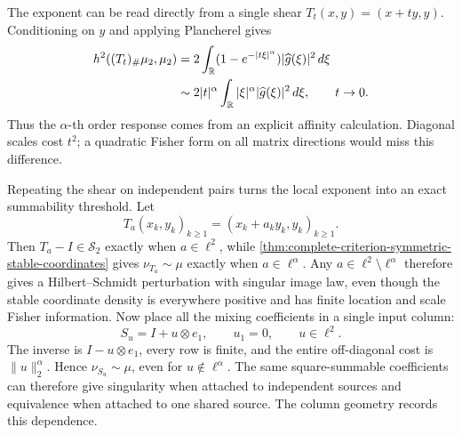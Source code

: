 The exponent can be read directly from a single shear
\(T_t(x,y)=(x+ty,y)\).  Conditioning on \(y\) and applying Plancherel gives
\begin{equation}
 \begin{aligned}
 h^2((T_t)_\#\mu_{2},\mu_{2})
 &=2\int_\mathbb R(1-e^{-|t\xi|^\alpha})
                  |\widehat g(\xi)|^2\,d\xi\\
 &\sim2|t|^\alpha\int_\mathbb R|\xi|^\alpha
                  |\widehat g(\xi)|^2\,d\xi,\qquad t\to0.
 \end{aligned}
\end{equation}
Thus the \(\alpha\)-th order response comes from an explicit affinity
calculation. Diagonal scales cost \(t^2\); a quadratic Fisher form on all
matrix directions would miss this difference.

Repeating the shear on independent pairs turns the local exponent into
an exact summability threshold. Let
\[
 T_a(x_k,y_k)_{k\ge1}=(x_k+a_ky_k,y_k)_{k\ge1}.
\]
Then \(T_a-I\in\mathcal S_2\) exactly when \(a\in\ell^2\), while
\cref{thm:complete-criterion-symmetric-stable-coordinates} gives
\(\nu_{T_a}\sim\mu\) exactly when
\(a\in\ell^\alpha\).
Any \(a\in\ell^2\setminus\ell^\alpha\) therefore gives a
Hilbert--Schmidt perturbation with singular image law, even though the
stable coordinate density is everywhere positive and has finite location
and scale Fisher information.
Now place all the mixing coefficients in a single input column:
\[
 S_u=I+u\otimes e_1,\qquad u_1=0,\qquad u\in\ell^2.
\]
The inverse is \(I-u\otimes e_1\), every row is finite, and the entire
off-diagonal cost is \(\|u\|_2^\alpha\). Hence \(\nu_{S_u}\sim\mu\),
even for \(u\notin\ell^\alpha\). The same square-summable coefficients can
therefore give singularity when attached to independent sources and
equivalence when attached to one shared source. The column geometry records
this dependence.
